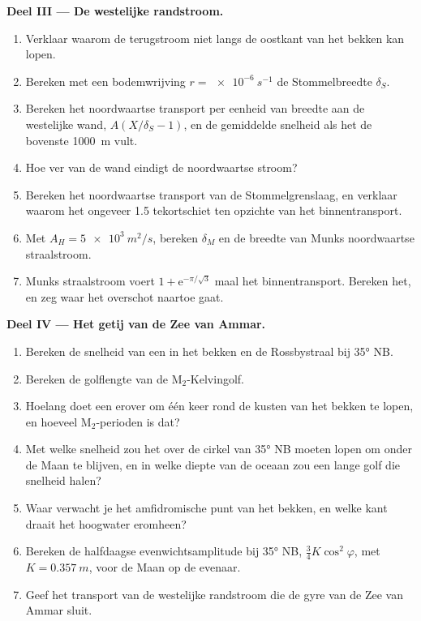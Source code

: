 \begin{problem}
\medskip\noindent\textbf{Deel III --- De westelijke randstroom.}
\begin{enumerate}[resume]
\item Verklaar waarom de terugstroom niet langs de oostkant van het bekken kan
  lopen.
\item Bereken met een bodemwrijving $r = \qty{e-6}{s^{-1}}$ de
  Stommelbreedte $\delta_S$.
\item Bereken het noordwaartse transport per eenheid van breedte aan de westelijke
  wand, $A(X/\delta_S - 1)$, en de gemiddelde snelheid als het de bovenste
  \qty{1000}{m} vult.
\item Hoe ver van de wand eindigt de noordwaartse stroom?
\item Bereken het noordwaartse transport van de Stommelgrenslaag, en verklaar
  waarom het ongeveer \qty{1.5}{\sverdrup} tekortschiet ten opzichte van het
  binnentransport.
\item Met $A_H = \qty{5e3}{m^2/s}$, bereken $\delta_M$ en de breedte van Munks
  noordwaartse straalstroom.
\item Munks straalstroom voert $1 + \mathrm e^{-\pi/\sqrt3}$ maal het
  binnentransport. Bereken het, en zeg waar het overschot naartoe gaat.
\end{enumerate}

\medskip\noindent\textbf{Deel IV --- Het getij van de Zee van Ammar.}
\begin{enumerate}[resume]
\item Bereken de snelheid van een  in het bekken en de Rossbystraal
  bij \ang{35} NB.
\item Bereken de golflengte van de M$_2$-Kelvingolf.
\item Hoelang doet een  erover om één keer rond de kusten van het
  bekken te lopen, en hoeveel M$_2$-perioden is dat?
\item Met welke snelheid zou het  over de cirkel van \ang{35} NB
  moeten lopen om onder de Maan te blijven, en in welke diepte van de oceaan zou
  een lange golf die snelheid halen?
\item Waar verwacht je het amfidromische punt van het bekken, en welke kant
  draait het hoogwater eromheen?
\item Bereken de halfdaagse evenwichtsamplitude bij \ang{35} NB, $\tfrac34
  K\cos^2\varphi$, met $K = \qty{0.357}{m}$, voor de Maan op de evenaar.
\item Geef het transport van de westelijke randstroom die de gyre van de Zee van
  Ammar sluit.
\end{enumerate}
\end{problem}
